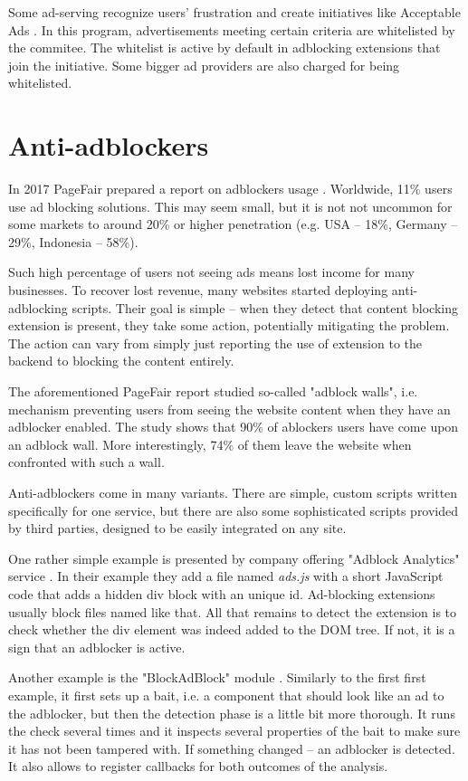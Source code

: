 Some ad-serving recognize users' frustration and create initiatives like Acceptable Ads \cite{acceptableads}.
In this program, advertisements meeting certain criteria are whitelisted by the commitee.
The whitelist is active by default in adblocking extensions that join the initiative.
Some bigger ad providers are also charged for being whitelisted.


\section{Anti-adblockers}

In 2017 PageFair prepared a report on adblockers usage \cite{pagefair:adblock-report}.
Worldwide, 11\% users use ad blocking solutions. This may seem small, but it is not not uncommon
for some markets to around 20\% or higher penetration (e.g. USA -- 18\%, Germany -- 29\%, Indonesia -- 58\%).

Such high percentage of users not seeing ads means lost income for many businesses.
To recover lost revenue, many websites started deploying anti-adblocking scripts.
Their goal is simple -- when they detect that content blocking extension is present, 
they take some action, potentially mitigating the problem.
The action can vary from simply just reporting the use of extension to the backend to blocking 
the content entirely.

The aforementioned PageFair report studied so-called "adblock walls", i.e. mechanism
preventing users from seeing the website content when they have an adblocker enabled.
The study shows that 90\% of ablockers users have come upon an adblock wall.
More interestingly, 74\% of them leave the website when confronted with such a wall.

Anti-adblockers come in many variants. There are simple, custom scripts written 
specifically for one service, but there are also some sophisticated scripts 
provided by third parties, designed to be easily integrated on any site.

One rather simple example is presented by company offering "Adblock Analytics" service \cite{detect-adblock}.
In their example they add a file named \emph{ads.js} with a short JavaScript code that adds a hidden div block with an unique id.
Ad-blocking extensions usually block files named like that. All that remains to detect the extension is to
check whether the div element was indeed added to the DOM tree. If not, it is a sign that an adblocker is active.

Another example is the "BlockAdBlock" module \cite{github:blockadblock}.
Similarly to the first first example, it first sets up a bait,
i.e. a component that should look like an ad to the adblocker, 
but then the detection phase is a little bit more thorough. It runs the check several times
and it inspects several properties of the bait to make sure it has not been tampered with.
If something changed -- an adblocker is detected.
It also allows to register callbacks for both outcomes of the analysis.

